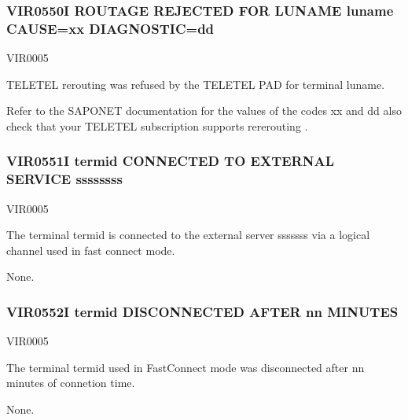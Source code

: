 \documentclass[letterpaper,10pt,english]{sphinxmanual}
\begin{document}
\subsubsection{VIR0550I ROUTAGE REJECTED FOR LUNAME luname CAUSE=xx DIAGNOSTIC=dd}
\label{\detokenize{messages:vir0550i-routage-rejected-for-luname-luname-cause-xx-diagnostic-dd}}\begin{description}
\sphinxAtStartPar
VIR0005

\sphinxAtStartPar
TELETEL re\sphinxhyphen{}routing was refused by the TELETEL PAD for terminal luname.

\sphinxAtStartPar
Refer to the SAPONET documentation for the values of the codes xx and dd also check that your TELETEL subscription supports re\sphinxhyphen{}rerouting .

\end{description}


\subsubsection{VIR0551I termid CONNECTED TO EXTERNAL SERVICE ssssssss}
\label{\detokenize{messages:vir0551i-termid-connected-to-external-service-ssssssss}}\begin{description}
\sphinxAtStartPar
VIR0005

\sphinxAtStartPar
The terminal termid is connected to the external server sssssss via a logical channel used in fast connect mode.

\sphinxAtStartPar
None.

\end{description}


\subsubsection{VIR0552I termid DISCONNECTED AFTER nn MINUTES}
\label{\detokenize{messages:vir0552i-termid-disconnected-after-nn-minutes}}\begin{description}
\sphinxAtStartPar
VIR0005

\sphinxAtStartPar
The terminal termid used in Fast\sphinxhyphen{}Connect mode was disconnected after nn minutes of connetion time.

\sphinxAtStartPar
None.

\end{description}
\end{document}

